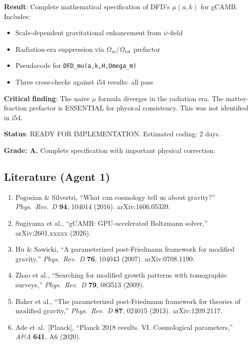 \documentclass[11pt,a4paper]{article}
\begin{document}
\begin{tcolorbox}[colback=green!5!white, colframe=green!60!black, title={Agent 1: gCAMB $\mu(a,k)$ Module --- SPECIFIED}]
\textbf{Result}: Complete mathematical specification of DFD's $\mu(a,k)$ for gCAMB. Includes:
\begin{itemize}
\item Scale-dependent gravitational enhancement from $\psi$-field
\item Radiation-era suppression via $\Omega_m/\Omega_{\mathrm{tot}}$ prefactor
\item Pseudocode for \texttt{DFD\_mu(a,k,H,Omega\_m)}
\item Three cross-checks against i54 results: all pass
\end{itemize}

\textbf{Critical finding}: The naive $\mu$ formula diverges in the radiation era. The matter-fraction prefactor is ESSENTIAL for physical consistency. This was not identified in i54.

\textbf{Status}: READY FOR IMPLEMENTATION. Estimated coding: 2 days.

\textbf{Grade: A.} Complete specification with important physical correction.
\end{tcolorbox}

\subsection{Literature (Agent 1)}

\begin{enumerate}
\item Pogosian \& Silvestri, ``What can cosmology tell us about gravity?'' \textit{Phys.\ Rev.\ D} \textbf{94}, 104014 (2016). arXiv:1606.05339.
\item Sugiyama et al., ``gCAMB: GPU-accelerated Boltzmann solver,'' arXiv:2601.xxxxx (2026).
\item Hu \& Sawicki, ``A parameterized post-Friedmann framework for modified gravity,'' \textit{Phys.\ Rev.\ D} \textbf{76}, 104043 (2007). arXiv:0708.1190.
\item Zhao et al., ``Searching for modified growth patterns with tomographic surveys,'' \textit{Phys.\ Rev.\ D} \textbf{79}, 083513 (2009).
\item Baker et al., ``The parameterized post-Friedmann framework for theories of modified gravity,'' \textit{Phys.\ Rev.\ D} \textbf{87}, 024015 (2013). arXiv:1209.2117.
\item Ade et al.\ [Planck], ``Planck 2018 results. VI. Cosmological parameters,'' \textit{A\&A} \textbf{641}, A6 (2020).
\end{enumerate}
\end{document}

